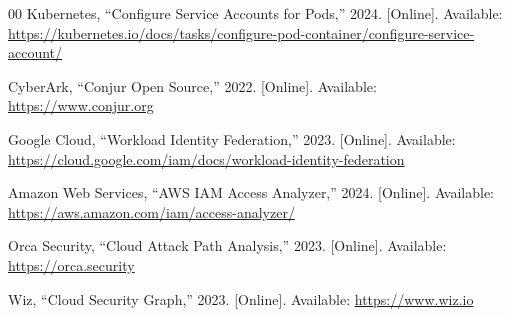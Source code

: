\documentclass[conference]{IEEEtran}
\begin{document}
\begin{thebibliography}{00}
Kubernetes, ``Configure Service Accounts for Pods,'' 2024.
[Online]. Available: \url{https://kubernetes.io/docs/tasks/configure-pod-container/configure-service-account/}

CyberArk, ``Conjur Open Source,'' 2022.
[Online]. Available: \url{https://www.conjur.org}

Google Cloud, ``Workload Identity Federation,'' 2023.
[Online]. Available: \url{https://cloud.google.com/iam/docs/workload-identity-federation}

Amazon Web Services, ``AWS IAM Access Analyzer,'' 2024.
[Online]. Available: \url{https://aws.amazon.com/iam/access-analyzer/}

Orca Security, ``Cloud Attack Path Analysis,'' 2023.
[Online]. Available: \url{https://orca.security}

Wiz, ``Cloud Security Graph,'' 2023.
[Online]. Available: \url{https://www.wiz.io}

\end{thebibliography}
\end{document}
